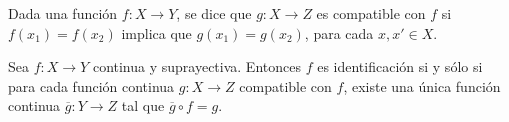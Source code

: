 

\begin{definition}
Dada una función $f : X \longrightarrow Y$, se dice que $g : X \longrightarrow Z$ es compatible con $f$ si $f(x_1) = f(x_2)$ implica que $g(x_1) = g(x_2)$, para cada $x, x' \in X$. 
\end{definition}

\begin{theorem}
Sea $f : X \longrightarrow Y$ continua y suprayectiva. Entonces $f$ es identificación si y sólo si para cada función continua $g : X \longrightarrow Z$ compatible con $f$, existe una única función continua $\overline{g} : Y \longrightarrow Z$ tal que $\overline{g} \circ f = g$.
\bigskip

\end{theorem}

